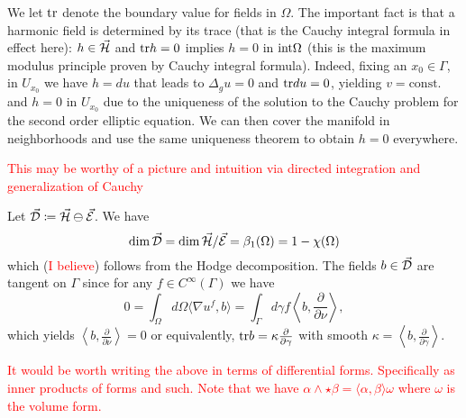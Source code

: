   We let $\mathrm{tr}$ denote the boundary value for fields in $\Omega$.  The important fact is that a harmonic field is determined by its trace (that is the Cauchy integral formula in effect here): $h\in \vec{\mathcal{H}}$ and $\mathrm{tr} h =0$ implies $h=0$ in $\mathrm{int} \Omega$ (this is the maximum modulus principle proven by Cauchy integral formula).  Indeed, fixing an $x_0\in \Gamma$, in $U_{x_0}$ we have $h=d u$ that leads to $\Delta_g u =0$ and $\mathrm{tr} du = 0$, yielding $v=\textrm{const.}$ and $h=0$ in $U_{x_0}$ due to the uniqueness of the solution to the Cauchy problem for the second order elliptic equation. We can then cover the manifold in neighborhoods and use the same uniqueness theorem to obtain $h=0$ everywhere. 
  
  \textcolor{red}{This may be worthy of a picture and intuition via directed integration and generalization of Cauchy}
  
  Let $\vec{\mathcal{D}} \coloneqq \vec{\mathcal{H}} \ominus \vec{\mathcal{E}}$. We have
  \[
  \dim \vec{\mathcal{D}} = \dim \vec{\mathcal{H}} / \vec{\mathcal{E}} = \beta_1 (\Omega)=1-\chi(\Omega)
  \]
  which (\textcolor{red}{I believe}) follows from the Hodge decomposition. The fields $b\in \vec{\mathcal{D}}$ are tangent on $\Gamma$ since for any $f\in C^{\infty}(\Gamma)$ we have
  \[
  0=\int_\Omega d\Omega \langle \nabla u^f,b\rangle = \int_\Gamma d\gamma f \left\langle b,\frac{\partial}{\partial \nu}\right\rangle,
  \]
  which yields $\left\langle b,\frac{\partial}{\partial \nu}\right\rangle=0$ or equivalently, $\mathrm{tr} b = \kappa \frac{\partial}{\partial \gamma}$ with smooth $\kappa = \left\langle b,\frac{\partial}{\partial \gamma}\right\rangle$.
  
  \textcolor{red}{It would be worth writing the above in terms of differential forms. Specifically as inner products of forms and such. Note that we have $\alpha \wedge \star \beta = \langle \alpha, \beta \rangle \omega$ where $\omega$ is the volume form.}  
  
